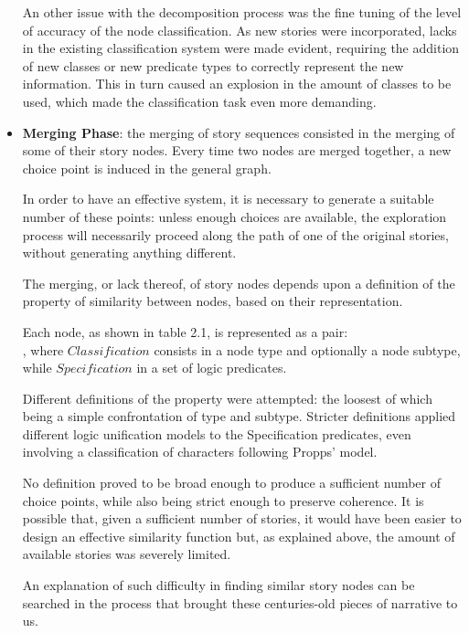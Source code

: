 \documentclass[12pt,a4paper,oneside]{report}
\begin{document}
\begin{itemize}
\bigskip

An other issue with the decomposition process was the fine tuning of the level of accuracy of the node classification. As new stories were incorporated, lacks in the existing classification system were made evident, requiring the addition of new classes or new predicate types to correctly represent the new information. This in turn caused an explosion in the amount of classes to be used, which made the classification task even more demanding.

\item \textbf{Merging Phase}: the merging of story sequences consisted in the merging of some of their story nodes. Every time two nodes are merged together, a new choice point is induced in the general graph. 

In order to have an effective system, it is necessary to generate a suitable number of these points: unless enough choices are available, the exploration process will necessarily proceed along the path of one of the original stories, without generating anything different.

The merging, or lack thereof, of story nodes depends upon a definition of the property of similarity between nodes, based on their representation.

Each node, as shown in table 2.1, is represented as a pair:\\ 
\(<Classification, Specification>\), where \(Classification\) consists in a node type and optionally a node subtype, while \(Specification\) in a set of logic predicates.

Different definitions of the property were attempted: the loosest of which being a simple confrontation of type and subtype. Stricter definitions applied different logic unification models to the Specification predicates, even involving a classification of characters following Propps' model.

No definition proved to be broad enough to produce a sufficient number of choice points, while also being strict enough to preserve coherence. It is possible that, given a sufficient number of stories, it would have been easier to design an effective similarity function but, as explained above, the amount of available stories was severely limited.

\bigskip

An explanation of such difficulty in finding similar story nodes can be searched in the process that brought these centuries-old pieces of narrative to us. 


\end{itemize}
\end{document}
